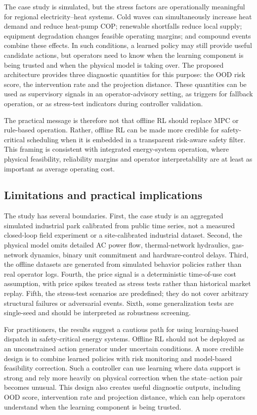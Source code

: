 \documentclass[preprint,12pt]{elsarticle}
\begin{document}
The case study is simulated, but the stress factors are operationally meaningful for regional electricity--heat systems. Cold waves can simultaneously increase heat demand and reduce heat-pump COP; renewable shortfalls reduce local supply; equipment degradation changes feasible operating margins; and compound events combine these effects. In such conditions, a learned policy may still provide useful candidate actions, but operators need to know when the learning component is being trusted and when the physical model is taking over. The proposed architecture provides three diagnostic quantities for this purpose: the OOD risk score, the intervention rate and the projection distance. These quantities can be used as supervisory signals in an operator-advisory setting, as triggers for fallback operation, or as stress-test indicators during controller validation.

The practical message is therefore not that offline RL should replace MPC or rule-based operation. Rather, offline RL can be made more credible for safety-critical scheduling when it is embedded in a transparent risk-aware safety filter. This framing is consistent with integrated energy-system operation, where physical feasibility, reliability margins and operator interpretability are at least as important as average operating cost.

\subsection{Limitations and practical implications}

The study has several boundaries. First, the case study is an aggregated simulated industrial park calibrated from public time series, not a measured closed-loop field experiment or a site-calibrated industrial dataset. Second, the physical model omits detailed AC power flow, thermal-network hydraulics, gas-network dynamics, binary unit commitment and hardware-control delays. Third, the offline datasets are generated from simulated behavior policies rather than real operator logs. Fourth, the price signal is a deterministic time-of-use cost assumption, with price spikes treated as stress tests rather than historical market replay. Fifth, the stress-test scenarios are predefined; they do not cover arbitrary structural failures or adversarial events. Sixth, some generalization tests are single-seed and should be interpreted as robustness screening.

For practitioners, the results suggest a cautious path for using learning-based dispatch in safety-critical energy systems. Offline RL should not be deployed as an unconstrained action generator under uncertain conditions. A more credible design is to combine learned policies with risk monitoring and model-based feasibility correction. Such a controller can use learning where data support is strong and rely more heavily on physical correction when the state--action pair becomes unusual. This design also creates useful diagnostic outputs, including OOD score, intervention rate and projection distance, which can help operators understand when the learning component is being trusted.
\end{document}
